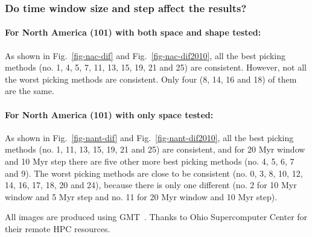 \subsubsection{Do time window size and step affect the results?}

\paragraph{For North America (101) with both space and shape tested:}

As shown in Fig.~\ref{fig-nac-dif} and Fig.~\ref{fig-nac-dif2010}, all the best
picking methods (no. 1, 4, 5, 7, 11, 13, 15, 19, 21 and 25) are consistent.
However, not all the worst picking methods are consistent. Only four  (8, 14,
16 and 18) of them are the same.

\paragraph{For North America (101) with only space tested:}

As shown in Fig.~\ref{fig-nant-dif} and Fig.~\ref{fig-nant-dif2010}, all the
best picking methods (no. 1, 11, 13, 15, 19, 21 and 25) are consistent, and for
20 Myr window and 10 Myr step there are five other more best picking methods
(no. 4, 5, 6, 7 and 9). The worst picking methods are close to be consistent
(no. 0, 3, 8, 10, 12, 14, 16, 17, 18, 20 and 24), because there is only one
different (no. 2 for 10 Myr window and 5 Myr step and no. 11 for 20 Myr window
and 10 Myr step).

\begin{acknowledgments}
All images are produced using GMT~\cite{W13}. Thanks to Ohio Supercomputer
Center for their remote HPC resources.
\end{acknowledgments}

